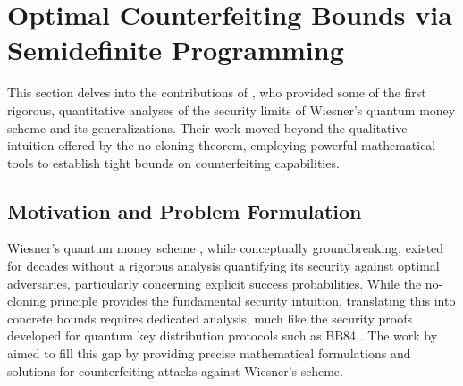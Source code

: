 \documentclass{article} %
\begin{document}
\color{black}
\newpage
\section{Optimal Counterfeiting Bounds via Semidefinite Programming}
This section delves into the contributions of \citet{Molina2012Optimal}, who provided some of the first rigorous, quantitative analyses of the security limits of Wiesner's quantum money scheme and its generalizations. Their work moved beyond the qualitative intuition offered by the no-cloning theorem, employing powerful mathematical tools to establish tight bounds on counterfeiting capabilities.

\subsection{Motivation and Problem Formulation}

Wiesner's quantum money scheme \citep{Wiesner1983Conjugate}, while conceptually groundbreaking, existed for decades without a rigorous analysis quantifying its security against optimal adversaries, particularly concerning explicit success probabilities. While the no-cloning principle \citep{WoottersZurek1982Single} provides the fundamental security intuition, translating this into concrete bounds requires dedicated analysis, much like the security proofs developed for quantum key distribution protocols such as BB84 \citep{BennettBrassard1984Quantum, ShorPreskill2000Simple}. The work by \citet{Molina2012Optimal} aimed to fill this gap by providing precise mathematical formulations and solutions for counterfeiting attacks against Wiesner's scheme.
\end{document}
